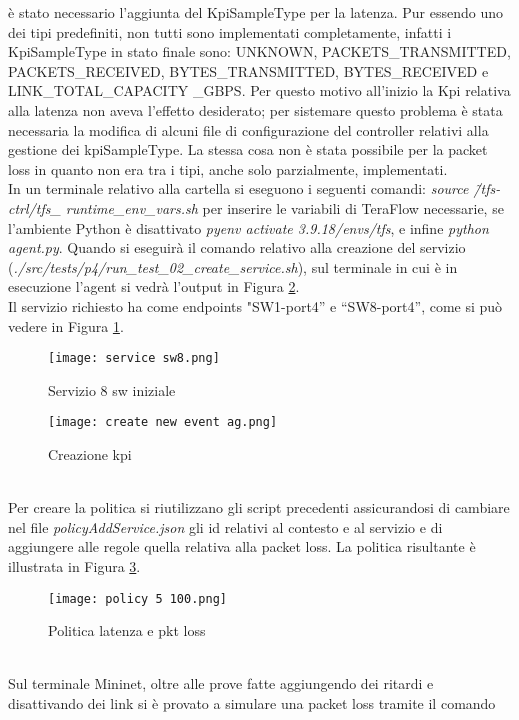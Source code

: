 è stato necessario l'aggiunta del KpiSampleType per la latenza. Pur essendo uno dei tipi predefiniti, non tutti sono implementati completamente, infatti
i KpiSampleType in stato finale sono: UNKNOWN, PACKETS\_TRANSMITTED, PACKETS\_RECEIVED, BYTES\_TRANSMITTED, BYTES\_RECEIVED e LINK\_TOTAL\_CAPACITY \_GBPS.
Per questo motivo all'inizio la Kpi relativa alla latenza non aveva l'effetto desiderato; per sistemare questo problema è stata necessaria la 
modifica di alcuni file di configurazione del controller relativi alla gestione dei kpiSampleType.
La stessa cosa non è stata possibile per la packet loss in quanto non era tra i tipi, anche solo parzialmente, implementati. 
\\In un terminale relativo alla cartella si eseguono i seguenti comandi: \textit{source \~/tfs-ctrl/tfs\_ runtime\_env\_vars.sh} per inserire le variabili di TeraFlow
necessarie, se l'ambiente Python è disattivato \textit{pyenv activate 3.9.18/envs/tfs}, e infine \textit{python agent.py}.
Quando si eseguirà il comando relativo alla creazione del servizio (\textit{./src/tests/p4/run\_test\_02\_create\_service.sh}),
sul terminale in cui è in esecuzione l'agent si vedrà l'output in Figura \ref{fig:ag}.
\\Il servizio richiesto ha come endpoints "SW1-port4” e “SW8-port4”, come si può vedere in Figura \ref{fig:sw8}.
\begin{figure}[h]
    \centering
   \texttt{[image: service sw8.png]}
    \caption{Servizio 8 sw iniziale}
    \label{fig:sw8}
\end{figure}
\begin{figure}[h]
    \centering
   \texttt{[image: create new event ag.png]}
    \caption{Creazione kpi}
    \label{fig:ag}
\end{figure}
\\Per creare la politica si riutilizzano gli script precedenti assicurandosi di cambiare nel file \textit{policyAddService.json}
gli id relativi al contesto e al servizio e di aggiungere alle regole quella relativa alla packet loss.
La politica risultante è illustrata in Figura \ref{fig:policy}.
\begin{figure}[h]
    \centering
   \texttt{[image: policy 5 100.png]}
    \caption{Politica latenza e pkt loss}
    \label{fig:policy}
\end{figure}
\\Sul terminale Mininet, oltre alle prove fatte aggiungendo dei ritardi e disattivando dei link si è provato a simulare una packet loss tramite il comando
